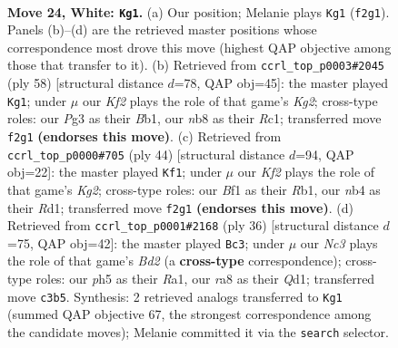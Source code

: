 \documentclass[11pt]{article}
\begin{document}
\clearpage

\begin{figure}[p]\centering
\begin{subfigure}{0.46\textwidth}\centering
\resizebox{\linewidth}{!}{%
\newchessgame
\chessboard[
  setfen={rnb1qr2/1p3k2/2p1p3/p2p1p1p/Pn1P1P2/2N2NP1/1PPQ1K1P/3R1B1R w - - 1 24},
  showmover=false,
  pgfstyle=straightmove, color=movearrow, markmove={f2-g1}
]}
\caption{}
\end{subfigure}\hfill
\begin{subfigure}{0.46\textwidth}\centering
\resizebox{\linewidth}{!}{%
\newchessgame
\chessboard[
  setfen={1r2qnk1/2r3pp/npb1p3/p2pPp2/P2P1P2/RNN3P1/1P3QKP/1BR5 w - - 7 30},
  showmover=false,
  pgfstyle=straightmove, color=movearrow, markmove={g2-g1}
]}
\caption{}
\end{subfigure}
\\[4pt]
\begin{subfigure}{0.46\textwidth}\centering
\resizebox{\linewidth}{!}{%
\newchessgame
\chessboard[
  setfen={r5k1/1pqr1pb1/p1nppn2/7p/P1P1PPp1/1PNNB1P1/3Q2KP/1R1R4 w - - 1 23},
  showmover=false,
  pgfstyle=straightmove, color=movearrow, markmove={g2-f1}
]}
\caption{}
\end{subfigure}\hfill
\begin{subfigure}{0.46\textwidth}\centering
\resizebox{\linewidth}{!}{%
\newchessgame
\chessboard[
  setfen={rnr2bk1/3q1pp1/1p1ppn1p/p7/3PP3/P4NNP/1P1B1PP1/R2QR1K1 w - - 1 19},
  showmover=false,
  pgfstyle=straightmove, color=movearrow, markmove={d2-c3}
]}
\caption{}
\end{subfigure}
\caption{\textbf{Move 24, White: \texttt{Kg1}.} (a) Our position; Melanie plays \texttt{Kg1} (\texttt{f2g1}). Panels (b)--(d) are the retrieved master positions whose correspondence most drove this move (highest QAP objective among those that transfer to it). (b) Retrieved from \texttt{ccrl\_top\_p0003\#2045} (ply 58) [structural distance $d$=78, QAP obj=45]: the master played \texttt{Kg1}; under $\mu$ our \emph{Kf2} plays the role of that game's \emph{Kg2}; cross-type roles: our \emph{P}g3 as their \emph{B}b1, our \emph{n}b8 as their \emph{R}c1; transferred move \texttt{f2g1} \textbf{(endorses this move)}. (c) Retrieved from \texttt{ccrl\_top\_p0000\#705} (ply 44) [structural distance $d$=94, QAP obj=22]: the master played \texttt{Kf1}; under $\mu$ our \emph{Kf2} plays the role of that game's \emph{Kg2}; cross-type roles: our \emph{B}f1 as their \emph{R}b1, our \emph{n}b4 as their \emph{R}d1; transferred move \texttt{f2g1} \textbf{(endorses this move)}. (d) Retrieved from \texttt{ccrl\_top\_p0001\#2168} (ply 36) [structural distance $d$=75, QAP obj=42]: the master played \texttt{Bc3}; under $\mu$ our \emph{Nc3} plays the role of that game's \emph{Bd2} (a \textbf{cross-type} correspondence); cross-type roles: our \emph{p}h5 as their \emph{R}a1, our \emph{r}a8 as their \emph{Q}d1; transferred move \texttt{c3b5}. Synthesis: 2 retrieved analogs transferred to \texttt{Kg1} (summed QAP objective 67, the strongest correspondence among the candidate moves); Melanie committed it via the \texttt{search} selector.}
\label{fig:thought-m46}
\end{figure}
\end{document}
